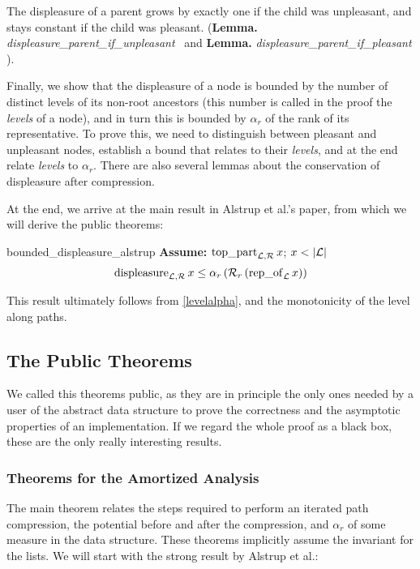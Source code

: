 \documentclass[headsepline,footsepline,footinclude=false,oneside,fontsize=11pt,paper=a4,listof=totoc,bibliography=totoc]{scrbook} %
\begin{document}
The displeasure of a parent grows by exactly one if the child was unpleasant, and stays constant if the child was pleasant. (\textbf{Lemma.} \textit{displeasure\_parent\_if\_unpleasant} \eqnum\, and \textbf{Lemma.} \textit{displeasure\_parent\_if\_pleasant} \eqnum).

Finally, we show that the displeasure of a node is bounded by the number of distinct levels of its non-root ancestors (this number is called in the proof the \textit{levels} of a node), and in turn this is bounded by $\alpha_r$ of the rank of its representative. To prove this, we need to distinguish between pleasant and unpleasant nodes, establish a bound that relates to their \textit{levels}, and at the end relate \textit{levels} to $\alpha_r$. There are also several lemmas about the conservation of displeasure after compression. 

At the end, we arrive at the main result in Alstrup et al.'s paper, from which we will derive the public theorems:

\begin{lemma}{bounded\_displeasure\_alstrup} \newline
	\textbf{Assume: } $\mathrm{top\_part}_{\mathcal{L},\mathcal{R}}\, x$; $x<|\LL|$
	\begin{equation}
		\mathrm{displeasure}_{\mathcal{L},\mathcal{R}}\, x \leq \alpha_r\, (\mathcal{R}_r\, (\mathrm{rep\_of}_\mathcal{L}\, x))
	\end{equation}
\end{lemma}

This result ultimately follows from \ref{levelalpha}, and the monotonicity of the level along paths.

\subsection{The Public Theorems}

We called this theorems public, as they are in principle the only ones needed by a user of the abstract data structure to prove the correctness and the asymptotic properties of an implementation. If we regard the whole proof as a black box, these are the only really interesting results.

\subsubsection{Theorems for the Amortized Analysis}

The main theorem relates the steps required to perform an iterated path compression, the potential before and after the compression, and $\alpha_r$ of some measure in the data structure. These theorems implicitly assume the invariant for the lists. We will start with the strong result by Alstrup et al.:
\end{document}
